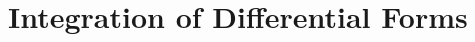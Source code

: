 \documentclass[../../templates/chapter]{subfiles}
\begin{document}
\chapter{Integration of Differential Forms}\label{chap:10-integration-of-differential-forms}


















\end{document}
